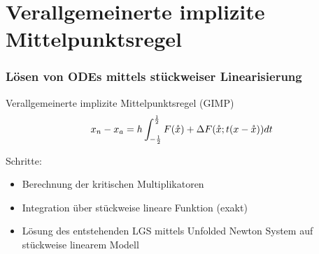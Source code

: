 \section[GIMP]{Verallgemeinerte implizite Mittelpunktsregel}
\begin{frame}[<+->]
\frametitle{Lösen von ODEs mittels stückweiser Linearisierung}
 \begin{block}{Verallgemeinerte implizite Mittelpunktsregel (GIMP)}
 \[
  x_n - x_a = h\int_{-\frac{1}{2}}^{\frac{1}{2}} F(\mathring{x}) + \Delta F(\mathring{x}; t(x-\mathring{x}))dt
 \]
\end{block}
Schritte:
\begin{itemize}
 \item Berechnung der kritischen Multiplikatoren
 \item Integration über stückweise lineare Funktion (exakt)
 \item Lösung des entstehenden LGS mittels Unfolded Newton System auf stückweise linearem Modell
\end{itemize}

\end{frame}

